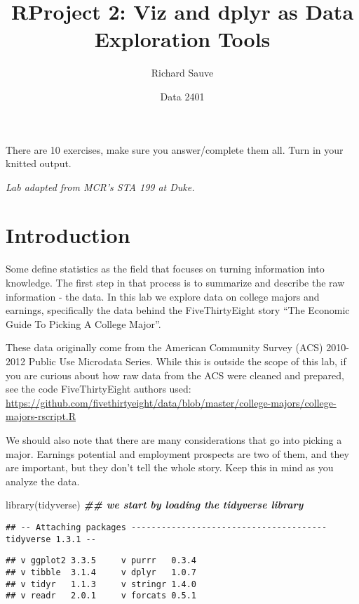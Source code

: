 \documentclass[
]{article}
\title{RProject 2: Viz and dplyr as Data Exploration Tools}
\author{Richard Sauve}
\date{Data 2401}
\newenvironment{Shaded}{\begin{snugshade}}{\end{snugshade}}
\newcommand{\DocumentationTok}[1]{\textcolor[rgb]{0.56,0.35,0.01}{\textbf{\textit{#1}}}}
\newcommand{\FunctionTok}[1]{\textcolor[rgb]{0.00,0.00,0.00}{#1}}
\newcommand{\NormalTok}[1]{#1}
\begin{document}
\maketitle

There are 10 exercises, make sure you answer/complete them all. Turn in
your knitted output.

\emph{Lab adapted from MCR's STA 199 at Duke.}

\hypertarget{introduction}{%
\section{Introduction}\label{introduction}}

Some define statistics as the field that focuses on turning information
into knowledge. The first step in that process is to summarize and
describe the raw information - the data. In this lab we explore data on
college majors and earnings, specifically the data behind the
FiveThirtyEight story ``The Economic Guide To Picking A College Major''.

These data originally come from the American Community Survey (ACS)
2010-2012 Public Use Microdata Series. While this is outside the scope
of this lab, if you are curious about how raw data from the ACS were
cleaned and prepared, see the code FiveThirtyEight authors used:
\url{https://github.com/fivethirtyeight/data/blob/master/college-majors/college-majors-rscript.R}

We should also note that there are many considerations that go into
picking a major. Earnings potential and employment prospects are two of
them, and they are important, but they don't tell the whole story. Keep
this in mind as you analyze the data.

\begin{Shaded}
\begin{Highlighting}[]
\FunctionTok{library}\NormalTok{(tidyverse) }\DocumentationTok{\#\# we start by loading the tidyverse library}
\end{Highlighting}
\end{Shaded}

\begin{verbatim}
## -- Attaching packages --------------------------------------- tidyverse 1.3.1 --
\end{verbatim}

\begin{verbatim}
## v ggplot2 3.3.5     v purrr   0.3.4
## v tibble  3.1.4     v dplyr   1.0.7
## v tidyr   1.1.3     v stringr 1.4.0
## v readr   2.0.1     v forcats 0.5.1
\end{verbatim}
\end{document}
